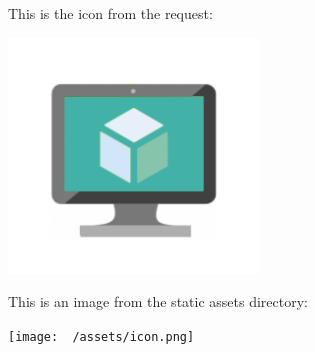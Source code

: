 This is the icon from the request:

\includegraphics[width=0.5\textwidth]{graphic.png}

This is an image from the static assets directory:

\texttt{[image: ~/assets/icon.png]}
